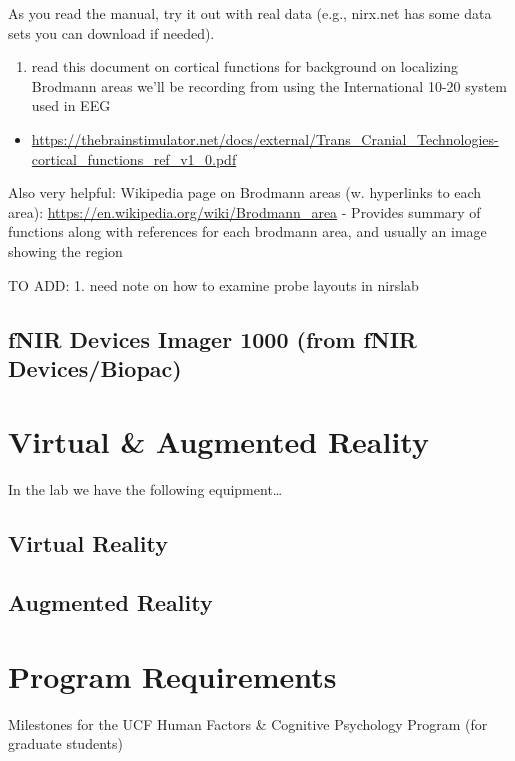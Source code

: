 \documentclass[
]{book}
\providecommand{\tightlist}{%
  \setlength{\itemsep}{0pt}\setlength{\parskip}{0pt}}
\begin{document}
As you read the manual, try it out with real data (e.g., nirx.net has some data sets you can download if needed).

\begin{enumerate}
\def\labelenumi{\arabic{enumi}.}
\setcounter{enumi}{1}
\tightlist
\item
  read this document on cortical functions for background on localizing Brodmann areas we'll be recording from using the International 10-20 system used in EEG
\end{enumerate}

\begin{itemize}
\tightlist
\item
  \url{https://thebrainstimulator.net/docs/external/Trans_Cranial_Technologies-cortical_functions_ref_v1_0.pdf}
\end{itemize}

Also very helpful: Wikipedia page on Brodmann areas (w. hyperlinks to each area):
\url{https://en.wikipedia.org/wiki/Brodmann_area}
- Provides summary of functions along with references for each brodmann area, and usually an image showing the region

TO ADD:
1. need note on how to examine probe layouts in nirslab

\hypertarget{fnir-devices-imager-1000-from-fnir-devicesbiopac}{%
\section{fNIR Devices Imager 1000 (from fNIR Devices/Biopac)}\label{fnir-devices-imager-1000-from-fnir-devicesbiopac}}

\hypertarget{virtual-augmented-reality}{%
\chapter{Virtual \& Augmented Reality}\label{virtual-augmented-reality}}

In the lab we have the following equipment\ldots{}

\hypertarget{virtual-reality}{%
\section{Virtual Reality}\label{virtual-reality}}

\hypertarget{augmented-reality}{%
\section{Augmented Reality}\label{augmented-reality}}

\hypertarget{program-requirements}{%
\chapter{Program Requirements}\label{program-requirements}}

Milestones for the UCF Human Factors \& Cognitive Psychology Program (for graduate students)

  
\end{document}
